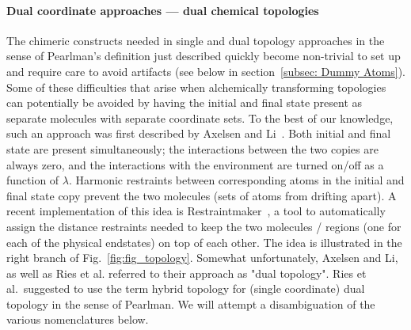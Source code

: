 \documentclass[9pt,bestpractices]{livecoms}
\begin{document}
\paragraph{Dual coordinate approaches --- dual chemical topologies}

The chimeric constructs needed in single and dual topology approaches in the sense of Pearlman’s definition just described quickly become non-trivial to set up and require care to avoid artifacts (see below in section~\ref{subsec: Dummy Atoms}). 
Some of these difficulties that arise when alchemically transforming topologies can potentially be avoided by having the initial and final state present as separate molecules with separate coordinate sets. To the best of our knowledge, such an approach was first described by Axelsen and Li~\cite{Axelsen_1998}. Both initial and final state are present simultaneously; the interactions between the two copies are always zero,  and the interactions with the environment are turned on/off as a function of $\lambda$. Harmonic restraints between corresponding atoms in the initial and final state copy prevent the two molecules (sets of atoms from drifting apart). %
A recent implementation of this idea is Restraintmaker~\cite{Ries_2022}, a tool to automatically assign the distance restraints needed to keep the two molecules / regions (one for each of the physical endstates) on top of each other. The idea is illustrated in the right branch of Fig.~\ref{fig:fig_topology}.  Somewhat unfortunately, Axelsen and Li, as well as Ries et al. referred to their approach as "dual topology". Ries et al.~suggested to use the term hybrid topology for (single coordinate) dual topology in the sense of Pearlman. We will attempt a disambiguation of the various nomenclatures below.
\end{document}
